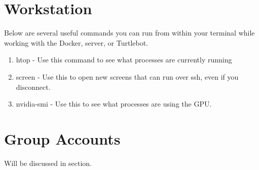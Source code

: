 \section{Workstation}
Below are several useful commands you can run from within your terminal while working with the Docker, server, or Turtlebot.
\begin{enumerate}
	\item htop - Use this command to see what processes are currently running
	\item screen - Use this to open new screens that can run over ssh, even if you disconnect.
	\item nvidia-smi - Use this to see what processes are using the GPU.
\end{enumerate}

\section{Group Accounts}
Will be discussed in section.